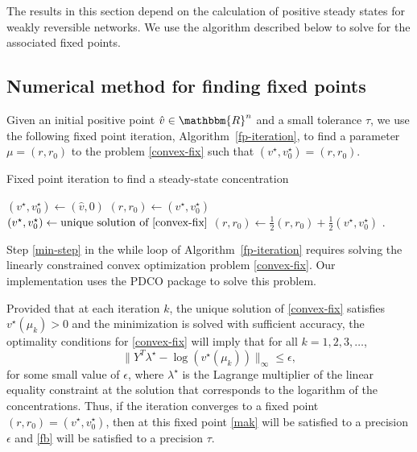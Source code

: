 \documentclass[smallextended]{svjour3}       %
\newcommand*{\0}{\mathbf{0}}
\newcommand*{\1}{\mathbf{1}}
\newcommand*{\R}{\mathbbm{R}}
\begin{document}
The results in this section depend on the calculation of positive steady states
for weakly reversible networks. We use the algorithm described below to solve
for the associated fixed points.

\subsection{Numerical method for finding fixed points}

Given an initial positive point $\hat v \in \R^{n}$ and a small
tolerance $\tau$, we use the following fixed point iteration,
Algorithm~\ref{fp-iteration}, to find a parameter $\mu = (r, r_0)$ to
the problem \eqref{convex-fix} such that $(v^\star,v_0^\star) =
(r,r_0)$.

\begin{algorithm}
\caption{Fixed point iteration to find a steady-state concentration}
\label{fp-iteration}
\begin{algorithmic}[1]
  \STATE $(v^\star,v_0^\star) \gets (\hat v,0)$
  \STATE $(r,r_0) \gets (v^\star,v_0^\star)$
  \STATE $(v^\star,v^\star_0)\gets \text{unique solution of \eqref{convex-fix}} $
		\label{min-step}
	\STATE $(r,r_0) \gets \frac{1}{2}(r,r_0) +\frac{1}{2}(v^\star,v^\star_0)$
  \ENDWHILE
  \label{fixpoint-alg}.
\end{algorithmic}
\end{algorithm}

Step \ref{min-step} in the while loop of Algorithm~\ref{fp-iteration} requires
solving the linearly constrained convex optimization problem
\eqref{convex-fix}. Our implementation uses the PDCO package \cite{pdco} to
solve this problem.

Provided that at each iteration $k$, the unique solution of \eqref{convex-fix}
satisfies $v^\star(\mu_k)>0$ and the minimization is solved with sufficient
accuracy, the optimality conditions for \eqref{convex-fix} will imply that for
all $k = 1, 2, 3, \dots$,
\[
	\|Y^T\lambda^\star-\log(v^\star(\mu_k))\|_\infty \leq \epsilon,
\] 
for some small value of $\epsilon$, where $\lambda^\star$ is the Lagrange
multiplier of the linear equality constraint at the solution that corresponds
to the logarithm of the concentrations. Thus, if the iteration
converges to a fixed point $(r,r_0) = (v^\star,v_0^\star)$, then at this fixed
point \eqref{mak} will be satisfied to a precision $\epsilon$ and \eqref{fb}
will be satisfied to a precision $\tau$.
\end{document}
